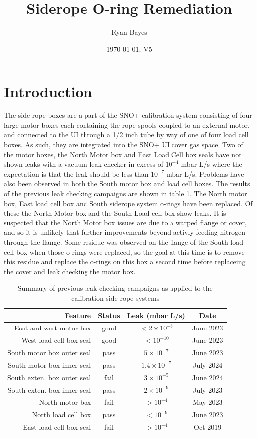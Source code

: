 \documentclass[11pt]{article}
\title{Siderope O-ring Remediation}
\author{Ryan Bayes}
\date{\today; V5}
\begin{document}
\maketitle
\section{Introduction}
The side rope boxes are a part of the SNO+ calibration system  consisting of four large motor boxes each containing the rope spools coupled to an external motor, and connected to the UI through a 1/2 inch tube by way of one of four load cell boxes. As such, they are integrated into the SNO+ UI cover gas space.  Two of the motor boxes, the North Motor box and East Load Cell box seals have not shown leaks with a vacuum leak checker in excess of $10^{-4}$ mbar L/s where the expectation is that the leak should be less than $10^{-7}$ mbar L/s. Problems have also been observed in both the South motor box and load cell boxes. The results of the previous leak checking campaigns are shown in table \ref{tab:leakCheck}. The North motor box, East load cell box and South siderope system o-rings have been replaced. Of these the North Motor box and the South Load cell box show leaks. It is suspected that the North Motor box issues are due to a warped flange or cover, and so it is unlikely that further improvements beyond activly feeding nitrogen through the flange. Some residue was observed on the flange of the South load cell box when those o-rings were replaced, so the goal at this time is to remove this residue and replace the o-rings on this box a second time before replaceing the cover and leak checking the motor box.  

\begin{table}
  \caption{Summary of previous leak checking campaigns as applied to the calibration side rope systems}
  \label{tab:leakCheck} 
  \begin{center}
    \begin{tabular}{|r|c|c|c|}
      \hline
      Feature & Status & Leak (mbar L/s)& Date  \\\hline
      East and west motor box & good & $< 2\times10^{-8}$ & June 2023 \\
      West load cell box seal & good & $< 10^{-10}$ & June 2023 \\
      South motor box outer seal & pass & $5\times10^{-7}$ & June 2023 \\
      South motor box inner seal & pass &  $1.4\times10^{-7}$ & July 2024 \\
      South exten. box outer seal & fail &  $3\times 10^{-5}$ & June 2024 \\
      South exten. box inner seal & pass &  $2\times10^{-9}$ & July 2023 \\
      North motor box & fail &  $ > 10^{-4}$ & May 2023 \\
      North load cell box & pass&  $ < 10^{-9}$ & June 2023 \\
      East load cell box seal & fail & $ > 10^{-4}$ & Oct 2019 \\
      \hline
    \end{tabular}
  \end{center}
\end{table}
\end{document}
